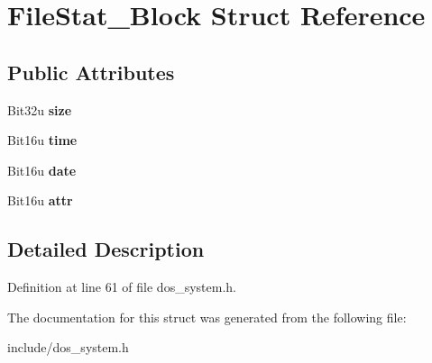 \hypertarget{structFileStat__Block}{\section{File\-Stat\-\_\-\-Block Struct Reference}
\label{structFileStat__Block}
}
\subsection*{Public Attributes}
\begin{DoxyCompactItemize}
\item 
\hypertarget{structFileStat__Block_a2a5d3c6eb19aa8c2a9cb6f490c5401c4}{Bit32u {\bfseries size}}\label{structFileStat__Block_a2a5d3c6eb19aa8c2a9cb6f490c5401c4}

\item 
\hypertarget{structFileStat__Block_a6c1eab1a66932b922bb569b0322ec31c}{Bit16u {\bfseries time}}\label{structFileStat__Block_a6c1eab1a66932b922bb569b0322ec31c}

\item 
\hypertarget{structFileStat__Block_aa1b125d12e215d896e585f117d0de3a3}{Bit16u {\bfseries date}}\label{structFileStat__Block_aa1b125d12e215d896e585f117d0de3a3}

\item 
\hypertarget{structFileStat__Block_a53c660e26cd1bf70780c95cc8c605c33}{Bit16u {\bfseries attr}}\label{structFileStat__Block_a53c660e26cd1bf70780c95cc8c605c33}

\end{DoxyCompactItemize}


\subsection{Detailed Description}


Definition at line 61 of file dos\-\_\-system.\-h.



The documentation for this struct was generated from the following file\-:\begin{DoxyCompactItemize}
\item 
include/dos\-\_\-system.\-h\end{DoxyCompactItemize}
